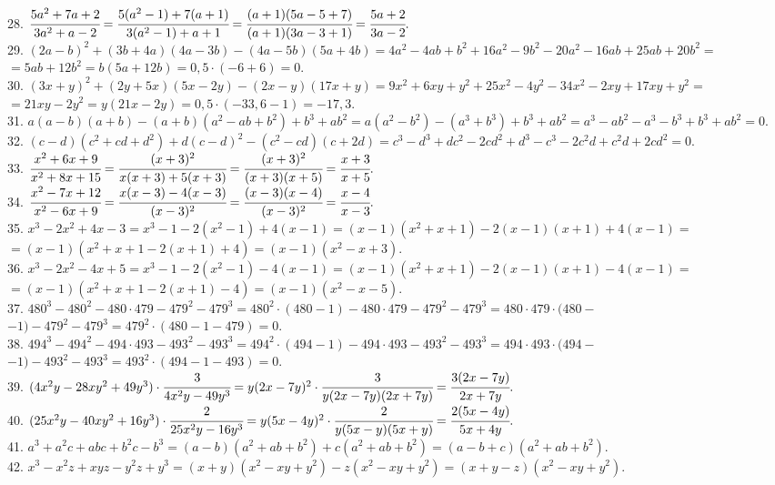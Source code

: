 \documentclass[12pt]{article}
\begin{document}
28. $\cfrac{5a^2+7a+2}{3a^2+a-2}=\cfrac{5(a^2-1)+7(a+1)}{3(a^2-1)+a+1}=
\cfrac{(a+1)(5a-5+7)}{(a+1)(3a-3+1)}=\cfrac{5a+2}{3a-2}.$\\
29. $(2a-b)^2+(3b+4a)(4a-3b)-(4a-5b)(5a+4b)=4a^2-4ab+b^2+16a^2-9b^2-20a^2-16ab+25ab+20b^2=$\\$=5ab+12b^2=b(5a+12b)=0,5\cdot(-6+6)=0.$\\
30. $(3x+y)^2+(2y+5x)(5x-2y)-(2x-y)(17x+y)=9x^2+6xy+y^2+25x^2-4y^2-34x^2-2xy+17xy+y^2=$\\$=21xy-2y^2=y(21x-2y)=0,5\cdot(-33,6-1)=-17,3.$\\
31. $a(a-b)(a+b)-(a+b)(a^2-ab+b^2)+b^3+ab^2=a(a^2-b^2)-(a^3+b^3)+b^3+ab^2=a^3-ab^2-a^3-b^3+b^3+ab^2=0.$\\
32. $(c-d)(c^2+cd+d^2)+d(c-d)^2-(c^2-cd)(c+2d)=c^3-d^3+dc^2-2cd^2+d^3-c^3-2c^2d+c^2d+2cd^2=0.$\\
33. $\cfrac{x^2+6x+9}{x^2+8x+15}=\cfrac{(x+3)^2}{x(x+3)+5(x+3)}=\cfrac{(x+3)^2}{(x+3)(x+5)}=\cfrac{x+3}{x+5}.$\\
34. $\cfrac{x^2-7x+12}{x^2-6x+9}=\cfrac{x(x-3)-4(x-3)}{(x-3)^2}=\cfrac{(x-3)(x-4)}{(x-3)^2}=\cfrac{x-4}{x-3}.$\\
35. $x^3-2x^2+4x-3=x^3-1-2(x^2-1)+4(x-1)=(x-1)(x^2+x+1)-2(x-1)(x+1)+4(x-1)=$\\$=(x-1)(x^2+x+1-2(x+1)+4)=
(x-1)(x^2-x+3).$\\
36. $x^3-2x^2-4x+5=x^3-1-2(x^2-1)-4(x-1)=(x-1)(x^2+x+1)-2(x-1)(x+1)-4(x-1)=$\\$=(x-1)(x^2+x+1-2(x+1)-4)=(x-1)(x^2-x-5).$\\
37. $480^3-480^2-480\cdot479-479^2-479^3=480^2\cdot(480-1)-480\cdot479-479^2-479^3=480\cdot479\cdot(480-$\\$-1)-479^2-479^3=
479^2\cdot(480-1-479)=0.$\\
38. $494^3-494^2-494\cdot493-493^2-493^3=494^2\cdot(494-1)-494\cdot493-493^2-493^3=494\cdot493\cdot(494-$\\$-1)-493^2-493^3=
493^2\cdot(494-1-493)=0.$\\
39. $(4x^2y-28xy^2+49y^3)\cdot\cfrac{3}{4x^2y-49y^3}=y(2x-7y)^2\cdot\cfrac{3}{y(2x-7y)(2x+7y)}=\cfrac{3(2x-7y)}{2x+7y}.$\\
40. $(25x^2y-40xy^2+16y^3)\cdot\cfrac{2}{25x^2y-16y^3}=y(5x-4y)^2\cdot\cfrac{2}{y(5x-y)(5x+y)}=\cfrac{2(5x-4y)}{5x+4y}.$\\
41. $a^3+a^2c+abc+b^2c-b^3=(a-b)(a^2+ab+b^2)+c(a^2+ab+b^2)=(a-b+c)(a^2+ab+b^2).$\\
42. $x^3-x^2z+xyz-y^2z+y^3=(x+y)(x^2-xy+y^2)-z(x^2-xy+y^2)=(x+y-z)(x^2-xy+y^2).$\\
\end{document}
